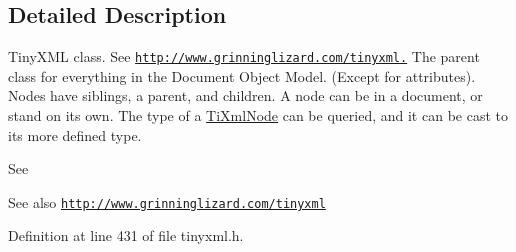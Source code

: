 \subsection{Detailed Description}
TinyXML class. See \href{http://www.grinninglizard.com/tinyxml.}{\tt http://www.grinninglizard.com/tinyxml.} The parent class for everything in the Document Object Model. (Except for attributes). Nodes have siblings, a parent, and children. A node can be in a document, or stand on its own. The type of a \hyperlink{class_ti_xml_node}{TiXmlNode} can be queried, and it can be cast to its more defined type.

See \begin{DoxySeeAlso}{See also}
\href{http://www.grinninglizard.com/tinyxml}{\tt http://www.grinninglizard.com/tinyxml} 
\end{DoxySeeAlso}


Definition at line 431 of file tinyxml.h.

